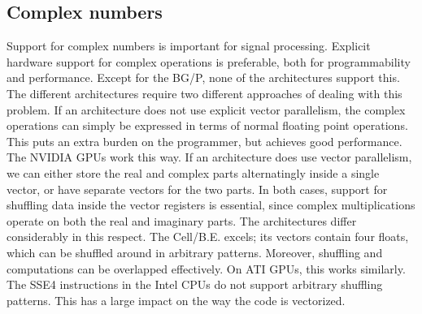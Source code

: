 \documentclass{article}
\newcommand{\longversion}[1]{}
\begin{document}
\subsection{Complex numbers}

\longversion{
Programming languages like C99 and FORTRAN have native support for complex
numbers, which is useful for signal-processing applications.
Arrays of complex numbers can easily be declared like
\texttt{complex float array[16];}.
This declaration enforces real and imaginary values at alternating memory
locations.
Unfortunately, not all architectures have efficient support for complex
multiply and division operations on vector elements that are declared this
way, since these operations require real and imaginary values to be shuffled.
Moreover, the real and imaginary parts of a product are computed differently.

The Blue Gene/P is the only architecture that efficiently supports all complex
operations, while the SSE4 instructions of the Core i7 provide limited support.
To obtain good performance on the other architectures, it may be necessary
to split the complex array into separate arrays for real and imaginary values.
This increases the programming effort, since all complex operations must be
programmed in terms of real operations.
Both formats are commonly used; a library like FFTW3 supports both of them.
}

Support for complex numbers is important for signal processing. 
Explicit hardware support for complex operations is
preferable, both for programmability and performance. 
Except for the BG/P, none of the architectures support this.
The different architectures require two different approaches of
dealing with this problem. If an architecture does not use
explicit vector parallelism, the complex operations can simply
be expressed in terms of normal floating point operations. This puts
an extra burden on the programmer, but achieves good performance. The
NVIDIA GPUs work this way.  If an architecture does use vector
parallelism, we can either store the real and complex parts alternatingly inside a
single vector, or have separate vectors for the two parts.  In both
cases, support for shuffling data inside the vector registers is
essential, since complex multiplications operate on both the real and imaginary parts.
The architectures differ considerably in this
respect.  The \mbox{Cell/B.E.} excels; its vectors contain four floats, which
can be shuffled around in arbitrary patterns. Moreover, 
shuffling and computations can be overlapped effectively.  On ATI
GPUs, this works similarly.  The SSE4 instructions in the
Intel CPUs do not support arbitrary shuffling patterns.
This has a large impact on the way the code is vectorized.
\end{document}

